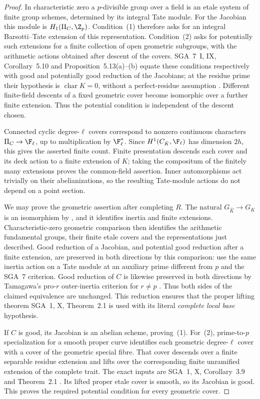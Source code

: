 \begin{proof}
In characteristic zero a $p$-divisible group over a field is an etale
system of finite group schemes, determined by its integral Tate module.
For the Jacobian this module is
$H_1(\Pi_C,\Z_p)$. Condition~(1) therefore asks for an integral
Barsotti--Tate extension of this representation. Condition~(2) asks
for potentially such extensions for a finite collection of open
geometric subgroups, with the arithmetic actions obtained after
descent of the covers. SGA~7~I, IX, Corollary~5.10 and
Proposition~5.13(a)--(b) equate these conditions respectively with good
and potentially good reduction of the Jacobians; at the residue prime
their hypothesis is $\operatorname{char}K=0$, without a perfect-residue
assumption \citep{BC_SGA7}. Different finite-field descents of a fixed
geometric cover become isomorphic over a further finite extension.
Thus the potential condition is independent of the descent chosen.

Connected cyclic degree-$\ell$ covers correspond to nonzero continuous
characters $\Pi_C\to\F_\ell$, up to multiplication by
$\F_\ell^*$. Since $H^1(C_{\bar K},\F_\ell)$ has dimension $2h$,
this gives the asserted finite count. Finite presentation descends
each cover and its deck action to a finite extension of $K$; taking
the compositum of the finitely many extensions proves the common-field
assertion. Inner automorphisms act trivially on their abelianizations,
so the resulting Tate-module actions do not depend on a point section.

We may prove the geometric assertion after completing $R$.
The natural $G_{\widehat K}\to G_K$ is an isomorphism by
\citet[Lemma 3.1]{BC_MinTsuj2022}, and it identifies inertia and
finite extensions. Characteristic-zero geometric comparison then
identifies the arithmetic fundamental groups, their finite etale
covers and the representations just described. Good reduction of a
Jacobian, and potential good reduction after a finite extension, are
preserved in both directions by this comparison: use the same inertia
action on a Tate module at an auxiliary prime different from $p$ and
the SGA~7 criterion. Good reduction of $C$ is likewise preserved in
both directions by Tamagawa's pro-$r$ outer-inertia criterion for
$r\ne p$ \citep[Theorem 5.3]{BC_Tamagawa}. Thus both sides of the
claimed equivalence are unchanged. This reduction ensures that the
proper lifting theorem SGA~1, X, Theorem~2.1 is used with its literal
\emph{complete local base} hypothesis.

If $C$ is good, its Jacobian is an abelian scheme, proving~(1).
For~(2), prime-to-$p$ specialization for a smooth proper curve
identifies each geometric degree-$\ell$ cover with a cover of the
geometric special fibre. That cover descends over a finite separable
residue extension and lifts over the corresponding finite unramified
extension of the complete trait. The exact inputs are SGA~1, X,
Corollary~3.9 and Theorem~2.1 \citep{BC_SGA1}.
Its lifted proper etale cover is smooth, so its Jacobian is good.
This proves the required potential condition for every geometric cover.


\end{proof}
